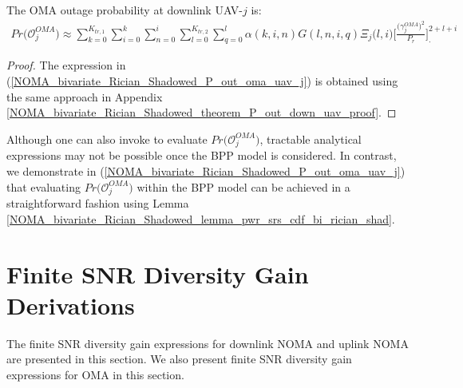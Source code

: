 \begin{theorem} \label{NOMA_bivariate_Rician_Shadowed_theorem_P_out_oma_uav_j}
The OMA outage probability at downlink UAV-$j$ is:
\begin{eqnarray} 
Pr\big(\mathcal{O}_{j}^{OMA}\big) \approx \sum_{k=0}^{K_{tr,1}} \sum_{i=0}^{k} \sum_{n=0}^{i} \sum_{l=0}^{K_{tr,2}} \sum_{q=0}^{l} \alpha(k,i,n) G(l,n,i,q) \Xi_j\big(l,i\big) \Bigg[\frac{\big(\gamma_j^{OMA}\big)^2}{P_r}\Bigg]^{2+l+i}_. \label{NOMA_bivariate_Rician_Shadowed_P_out_oma_uav_j}
\end{eqnarray}
\end{theorem}
\begin{proof}
The expression in (\ref{NOMA_bivariate_Rician_Shadowed_P_out_oma_uav_j}) is obtained using the same approach in Appendix \ref{NOMA_bivariate_Rician_Shadowed_theorem_P_out_down_uav_proof}.
\end{proof}

Although one can also invoke \cite[eq. (48)]{lopez2018bivariate} to evaluate $Pr\big(\mathcal{O}_{j}^{OMA}\big)$, tractable analytical expressions may not be possible once the BPP model is considered. In contrast, we demonstrate in (\ref{NOMA_bivariate_Rician_Shadowed_P_out_oma_uav_j}) that evaluating $Pr\big(\mathcal{O}_{j}^{OMA}\big)$ within the BPP model can be achieved in a straightforward fashion using Lemma \ref{NOMA_bivariate_Rician_Shadowed_lemma_pwr_srs_cdf_bi_rician_shad}.

\section{Finite SNR Diversity Gain Derivations} \label{NOMA_bivariate_Rician_Shadowed_sec_finite_SNR_diversity_gain}
The finite SNR diversity gain expressions for downlink NOMA and uplink NOMA are presented in this section. We also present finite SNR diversity gain expressions for OMA in this section.

